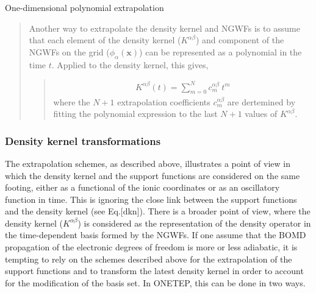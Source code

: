 \documentclass[letterpaper,10pt,english]{sphinxmanual}
\begin{document}
One-dimensional polynomial extrapolation
\begin{quote}

\begin{DUlineblock}{0em}
\item[] Another way to extrapolate the density kernel and NGWFs is to
assume that each element of the density kernel
(\(K^{\alpha\beta}\)) and component of the NGWFs on the grid
(\(\phi_{\alpha}(\mathbf{x})\)) can be represented as a
polynomial in the time \(t\). Applied to the density kernel,
this gives,
\end{DUlineblock}
\begin{quote}
\label{\detokenize{BOMD:equation-polyxtpol1}}\begin{equation}\label{equation:BOMD:polyxtpol1}
\begin{split}K^{\alpha\beta}(t) = \sum_{m=0}^N c^{\alpha \beta}_m \ t^{m}\end{split}
\end{equation}
where the \(N+1\) extrapolation coefficients
\(c^{\alpha \beta}_m\) are dertemined by fitting the
polynomial expression to the last \(N+1\) values of
\(K^{\alpha\beta}\).
\end{quote}
\end{quote}


\subsubsection{Density kernel transformations}
\label{\detokenize{BOMD:density-kernel-transformations}}
The extrapolation schemes, as described above, illustrates a point of
view in which the density kernel and the support functions are
considered on the same footing, either as a functional of the ionic
coordinates or as an oscillatory function in time. This is ignoring the
close link between the support functions and the density kernel (see
Eq.{[}dkn{]}). There is a broader point of view, where the density kernel
(\(K^{\alpha \beta}\)) is considered as the representation of the
density operator in the time-dependent basis formed by the NGWFs. If one
assume that the BOMD propagation of the electronic degrees of freedom is
more or less adiabatic, it is tempting to rely on the schemes described
above for the extrapolation of the support functions and to transform
the latest density kernel in order to account for the modification of
the basis set. In ONETEP, this can be done in two ways.
\end{document}
